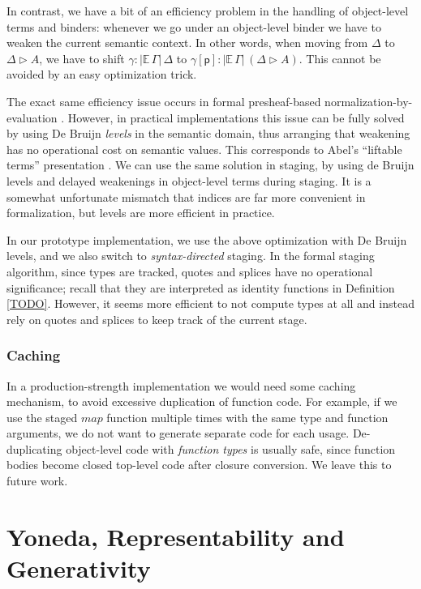 \documentclass[acmsmall]{acmart}
\newcommand{\mit}[1]{\mathit{#1}}
\newcommand{\mbb}[1]{\mathbb{#1}}
\newcommand{\ext}{\triangleright}
\newcommand{\p}{\mathsf{p}}
\newcommand{\ev}{\mbb{E}}
\theoremstyle{remark}
\begin{document}
In contrast, we have a bit of an efficiency problem in the handling of object-level
terms and binders: whenever we go under an object-level binder we have to weaken
the current semantic context. In other words, when moving from $\Delta$ to
$\Delta \ext A$, we have to shift $\gamma : |\ev\,\Gamma|\,\Delta$ to
$\gamma[\p] : |\ev\,\Gamma|\,(\Delta \ext A)$. This cannot be avoided by an easy
optimization trick.

The exact same efficiency issue occurs in formal presheaf-based
normalization-by-evaluation \cite{TODO}. However, in practical implementations
\cite{TODO} this issue can be fully solved by using De Bruijn \emph{levels} in
the semantic domain, thus arranging that weakening has no operational cost on
semantic values. This corresponds to Abel's ``liftable terms'' presentation
\cite{TODO}. We can use the same solution in staging, by using de Bruijn levels
and delayed weakenings in object-level terms during staging. It is a somewhat
unfortunate mismatch that indices are far more convenient in formalization, but
levels are more efficient in practice.

In our prototype implementation, we use the above optimization with De Bruijn
levels, and we also switch to \emph{syntax-directed} staging. In the formal
staging algorithm, since types are tracked, quotes and splices have no
operational significance; recall that they are interpreted as identity functions
in Definition \ref{TODO}. However, it seems more efficient to not compute types
at all and instead rely on quotes and splices to keep track of the current
stage.

\subsubsection{Caching} In a production-strength implementation we would need some
caching mechanism, to avoid excessive duplication of function code. For example,
if we use the staged $\mit{map}$ function multiple times with the same type and
function arguments, we do not want to generate separate code for each
usage. De-duplicating object-level code with \emph{function types} is
usually safe, since function bodies become closed top-level code after closure
conversion. We leave this to future work.

\section{Yoneda, Representability and Generativity}
\end{document}
